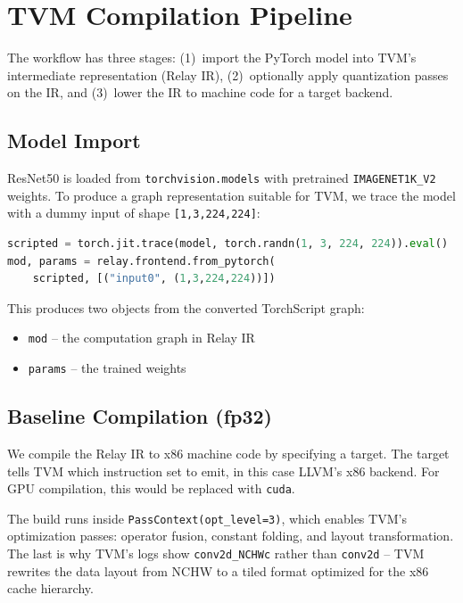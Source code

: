 \documentclass[11pt,a4paper]{article}
\begin{document}
\section{TVM Compilation Pipeline}

The workflow has three stages: (1)~import the PyTorch model into TVM's intermediate representation (Relay IR), (2)~optionally apply quantization passes on the IR, and (3)~lower the IR to machine code for a target backend.

\subsection{Model Import}

ResNet50 is loaded from \texttt{torchvision.models} with pretrained \texttt{IMAGENET1K\_V2} weights. To produce a graph representation suitable for TVM, we trace the model with a dummy input of shape \texttt{[1,3,224,224]}:

\begin{lstlisting}[language=Python]
scripted = torch.jit.trace(model, torch.randn(1, 3, 224, 224)).eval()
mod, params = relay.frontend.from_pytorch(
    scripted, [("input0", (1,3,224,224))])
\end{lstlisting}

This produces two objects from the converted TorchScript graph:
\begin{itemize}
  \item \texttt{mod} -- the computation graph in Relay IR
  \item \texttt{params} -- the trained weights
\end{itemize}

\subsection{Baseline Compilation (fp32)}

We compile the Relay IR to x86 machine code by specifying a target. The target tells TVM which instruction set to emit, in this case LLVM's x86 backend. For GPU compilation, this would be replaced with \texttt{cuda}.

The build runs inside \texttt{PassContext(opt\_level=3)}, which enables TVM's optimization passes: operator fusion, constant folding, and layout transformation. The last is why TVM's logs show \texttt{conv2d\_NCHWc} rather than \texttt{conv2d} -- TVM rewrites the data layout from NCHW to a tiled format optimized for the x86 cache hierarchy.
\end{document}
